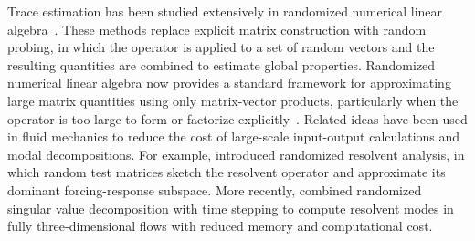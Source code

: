 Trace estimation has been studied extensively in randomized numerical linear algebra~\citep{haim-sivan-2011}. These methods replace explicit matrix construction with random probing, in which the operator is applied to a set of random vectors and the resulting quantities are combined to estimate global properties. Randomized numerical linear algebra now provides a standard framework for approximating large matrix quantities using only matrix-vector products, particularly when the operator is too large to form or factorize explicitly~\citep{martinsson-tropp-2020}. Related ideas have been used in fluid mechanics to reduce the cost of large-scale input-output calculations and modal decompositions. For example, \citet{ribeiro-yeh-taira-2020} introduced randomized resolvent analysis, in which random test matrices sketch the resolvent operator and approximate its dominant forcing-response subspace. More recently, \citet{farghadan-martini-towne-2025} combined randomized singular value decomposition with time stepping to compute resolvent modes in fully three-dimensional flows with reduced memory and computational cost.

